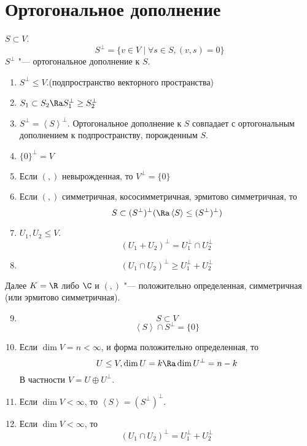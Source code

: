 ﻿\section{Ортогональное дополнение}

\begin{Def}
	$S \subset V$.
	\[ S^\bot = \{v \in V \mid \forall s \in S, (v, s) = 0\} \]
	$S^\bot$ "--- ортогональное дополнение к $S$.
\end{Def}

\begin{conseq}
	\begin{enumerate}
	\item
		$S^\bot \le V$.(подпространство векторного пространства)

	\item
		$S_1 \subset S_2 \Ra S_1^\bot \ge S_2^\bot$

	\item
		$S^\bot = \left<S\right>^\bot$.
		Ортогональное дополнение к $S$ совпадает
		с ортогональным дополнением к подпространству, порожденным $S$.

	\item
		$\{0\}^\bot = V$

	\item
		Если $(,)$ невырожденная, то $V^\bot = \{0\}$

	\item
		Если $(,)$ симметричная, кососимметричная, эрмитово симметричная, то
		\[ S \subset (S^\bot)^\bot (\Ra \left<S\right> \le (S^\bot)^\bot) \]

	\item
		$U_1, U_2 \le V$.
		\[ (U_1 + U_2)^\bot = U_1^\bot \cap U_2^\bot \]

	\item
		\[ (U_1 \cap U_2)^\bot \ge U_1^\bot + U_2^\bot \]
	\end{enumerate}
	\begin{Rem}
		Далее $K = \R$ либо $\C$ и $(,)$ "--- положительно определенная, симметричная (или эрмитово симметричная).
	\end{Rem}
	\begin{enumerate}
	\setcounter{enumi}{8}
	\item
	$$S \subset V$$
	$$\left<S\right> \cap S^{\bot} = \{0\}$$
	\item
		Если $\dim V = n < \infty$, и форма положительно определенная, то
		\[ U \le V, \dim U = k \Ra \dim U^\bot = n - k \]
		В частности $V = U \oplus U^\bot$.

	\item
		Если $\dim V < \infty$, то $\left<S\right> = (S^\bot)^\bot$.

	\item
		Если $\dim V < \infty$, то
		\[ (U_1 \cap U_2)^\bot = U_1^\bot + U_2^\bot \]
	\end{enumerate}
\end{conseq}
